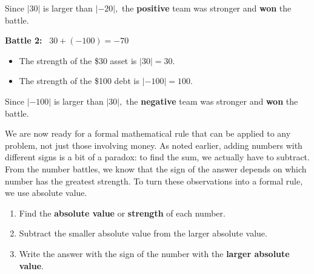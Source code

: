 \documentclass{ximera}[font=12pt]
\begin{document}
Since $|30|$ is larger than $|-20|,$ the \textbf{positive} team was stronger and \textbf{won} the battle.


\textcolor{glaucous}{\textbf{Battle 2:}} \ $30 + (-100) = -70$
\begin{itemize}
    \item[] The strength of the \$30 asset is $|30| = 30$.
    \item[] The strength of the \$100 debt is $|-100| = 100$.
\end{itemize}

Since $|-100|$ is larger than $|30|,$ the \textbf{negative} team was stronger and \textbf{won} the battle.

We are now ready for a formal mathematical rule that can be applied to any problem, not just those involving money.  
As noted earlier, adding numbers with different signs is a bit of a paradox: to find the sum, 
we actually have to subtract.  From the number battles, we know that the sign of the answer depends on which number 
has the greatest strength.  To turn these observations into a formal rule, we use absolute value.


\begin{procedure}

\begin{enumerate} 
    \item Find the \textbf{absolute value} or \textbf{strength} of each number.

     \item Subtract the smaller absolute value from the larger absolute value.

     \item Write the answer with the sign of the number with the \textbf{larger absolute value}.
\end{enumerate}
\end{procedure}
\end{document}
